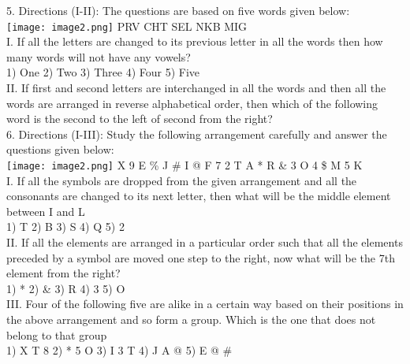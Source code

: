 \documentclass[
]{article}
\begin{document}
5. Directions (I-II): The questions are based on five words given below:\\
\texttt{[image: image2.png]}
PRV CHT SEL NKB MIG\\


I. If all the letters are changed to its previous letter in all the words then how many words will not have any vowels?\\
1) One \hspace{2mm}2) Two \hspace{2mm}3) Three \hspace{2mm}4) Four \hspace{2mm}5) Five\\

II. If first and second letters are interchanged in all the words and then all the words are
arranged in reverse alphabetical order, then which of the following word is the second to the left of second from the right?\\

6. Directions (I-III): Study the following arrangement carefully and answer the questions
given below:\\
\texttt{[image: image2.png]}
X 9 E \% J \# I @ F 7 2 T A * R \& 3 O 4 \$ M 5 K\\

I. If all the symbols are dropped from the given arrangement and all the consonants are
changed to its next letter, then what will be the middle element between I and L\\
1) T \hspace{2mm}2) B \hspace{2mm}3) S \hspace{2mm}4) Q \hspace{2mm}5) 2\\

II. If all the elements are arranged in a particular order such that all the elements preceded
by a symbol are moved one step to the right, now what will be the 7th element from the
right?\\
1) * \hspace{2mm}2) & \hspace{2mm}3) R \hspace{2mm}4) 3 \hspace{2mm}5) O\\

III. Four of the following five are alike in a certain way based on their positions in the above
arrangement and so form a group. Which is the one that does not belong to that group\\
1) X T 8 \hspace{2mm}2) * 5 O \hspace{2mm}3) I 3 T \hspace{2mm}4) J A @ \hspace{2mm}5) E @ \#\\
\end{document}
